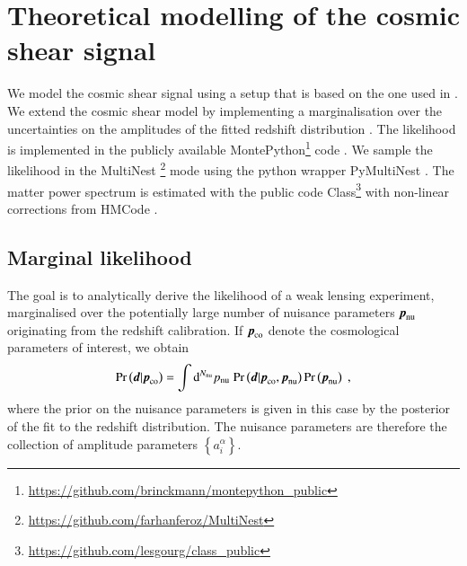 \documentclass{aa}
\newcommand{\eq}[1]{\begin{equation}  #1 \end{equation}}
\newcommand{\br}[1]{\left( #1 \right)}
\newcommand{\bc}[1]{\left\{ #1 \right\}}
\newcommand{\dd}{{\rm d}}
\newcommand{\pr}{{\rm Pr}}
\begin{document}
\section{Theoretical modelling of the cosmic shear signal}
We model the cosmic shear signal using a setup that is based on the one used in . We extend the cosmic shear model by implementing a marginalisation over the uncertainties on the amplitudes of the fitted redshift distribution . The likelihood is implemented in the publicly available {\sc MontePython}\footnote{\url{https://github.com/brinckmann/montepython_public}} code \citep{Audren:2012wb, Brinckmann:2018cvx}. We sample the likelihood in the {\sc MultiNest} \footnote{\url{https://github.com/farhanferoz/MultiNest}} mode \citep{feroz09,feroz19} using the python wrapper {\sc PyMultiNest} \citep{buchner14}. The matter power spectrum is estimated with the public code {\sc Class}\footnote{\url{https://github.com/lesgourg/class_public}}\citep{blas11} with non-linear corrections from {\sc HMCode} \citep{mead15}.
\subsection{Marginal likelihood}

The goal is to analytically derive the likelihood of a weak lensing experiment, marginalised over the potentially large number of nuisance parameters $\boldsymbol{p}_{\rm nu}$ originating from the redshift calibration. If $\boldsymbol{p}_{\rm co}$ denote the cosmological parameters of interest, we obtain
\eq{
\pr \br{\boldsymbol{d} | \boldsymbol{p}_{\rm co}} = \int \dd^{N_{\rm nu}} p_{\rm nu}\; \pr \br{\boldsymbol{d} | \boldsymbol{p}_{\rm co}, \boldsymbol{p}_{\rm nu}} \pr \br{\boldsymbol{p}_{\rm nu}}\;,
}
where the prior on the nuisance parameters is given in this case by the posterior of the fit to the redshift distribution. The nuisance parameters are therefore the collection of amplitude parameters $\bc{a_i^\alpha}$.
\end{document}
